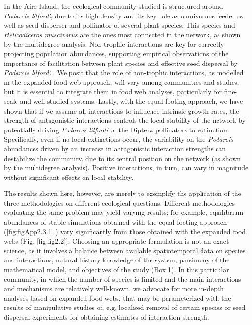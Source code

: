 In the Aire Island, the ecological community studied is structured around \textit{Podarcis lilfordi}, due to its high density and its key role as omnivorous feeder as well as seed disperser and pollinator of several plant species. This species and \textit{Helicodiceros muscivorus} are the ones most connected in the network, as shown by the multidegree analysis. Non-trophic interactions are key for correctly projecting population abundances, supporting empirical observations of the importance of facilitation between plant species \citep{Perez-Mellado2006} and effective seed dispersal by \textit{Podarcis lilfordi} \citep{Perez-Mellado2000}. We posit that the role of non-trophic interactions, as modelled in the expanded food web approach, will vary among communities and studies, but it is essential to integrate them in food web analyses, particularly for fine-scale and well-studied systems. Lastly, with the equal footing approach, we have shown that if we assume all interactions to influence intrinsic growth rates, the strength of antagonistic interactions controls the local stability of the network by potentially driving \textit{Podarcis lilfordi} or the Diptera pollinators to extinction. Specifically, even if no local extinctions occur, the variability on the \textit{Podarcis} abundances driven by an increase in antagonistic interaction strengths can destabilize the community, due to its central position on the network (as shown by the multidegree analysis). Positive interactions, in turn, can vary in magnitude without significant effects on local stability.

The results shown here, however, are merely to exemplify the application of the three methodologies on different ecological questions. Different methodologies evaluating the same problem may yield varying results; for example, equilibrium abundances of stable simulations obtained with the equal footing approach (\cref{fig:figApp2.3.1} ) vary significantly from those obtained with the expanded food webs (Fig. \ref{fig:fig2.2}). Choosing an appropriate formulation is not an exact science, as it involves a balance between available spatiotemporal data on species and interactions, natural history knowledge of the system, parsimony of the mathematical model, and objectives of the study (Box 1). In this particular community, in which the number of species is limited and the main interactions and mechanisms are relatively well-known, we advocate for more in-depth analyses based on expanded food webs, that may be parameterized with the results of manipulative studies of, e.g. localised removal of certain species or seed dispersal experiments for obtaining estimates of interaction strength.

